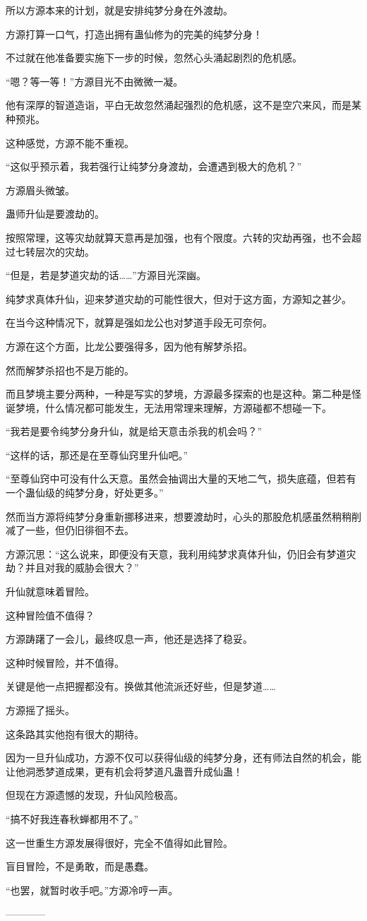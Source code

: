 \begin{this_body}
所以方源本来的计划，就是安排纯梦分身在外渡劫。

方源打算一口气，打造出拥有蛊仙修为的完美的纯梦分身！

不过就在他准备要实施下一步的时候，忽然心头涌起剧烈的危机感。

“嗯？等一等！”方源目光不由微微一凝。

他有深厚的智道造诣，平白无故忽然涌起强烈的危机感，这不是空穴来风，而是某种预兆。

这种感觉，方源不能不重视。

“这似乎预示着，我若强行让纯梦分身渡劫，会遭遇到极大的危机？”

方源眉头微皱。

蛊师升仙是要渡劫的。

按照常理，这等灾劫就算天意再是加强，也有个限度。六转的灾劫再强，也不会超过七转层次的灾劫。

“但是，若是梦道灾劫的话……”方源目光深幽。

纯梦求真体升仙，迎来梦道灾劫的可能性很大，但对于这方面，方源知之甚少。

在当今这种情况下，就算是强如龙公也对梦道手段无可奈何。

方源在这个方面，比龙公要强得多，因为他有解梦杀招。

然而解梦杀招也不是万能的。

而且梦境主要分两种，一种是写实的梦境，方源最多探索的也是这种。第二种是怪诞梦境，什么情况都可能发生，无法用常理来理解，方源碰都不想碰一下。

“我若是要令纯梦分身升仙，就是给天意击杀我的机会吗？”

“这样的话，那还是在至尊仙窍里升仙吧。”

“至尊仙窍中可没有什么天意。虽然会抽调出大量的天地二气，损失底蕴，但若有一个蛊仙级的纯梦分身，好处更多。”

然而当方源将纯梦分身重新挪移进来，想要渡劫时，心头的那股危机感虽然稍稍削减了一些，但仍旧徘徊不去。

方源沉思：“这么说来，即便没有天意，我利用纯梦求真体升仙，仍旧会有梦道灾劫？并且对我的威胁会很大？”

升仙就意味着冒险。

这种冒险值不值得？

方源踌躇了一会儿，最终叹息一声，他还是选择了稳妥。

这种时候冒险，并不值得。

关键是他一点把握都没有。换做其他流派还好些，但是梦道……

方源摇了摇头。

这条路其实他抱有很大的期待。

因为一旦升仙成功，方源不仅可以获得仙级的纯梦分身，还有师法自然的机会，能让他洞悉梦道成果，更有机会将梦道凡蛊晋升成仙蛊！

但现在方源遗憾的发现，升仙风险极高。

“搞不好我连春秋蝉都用不了。”

这一世重生方源发展得很好，完全不值得如此冒险。

盲目冒险，不是勇敢，而是愚蠢。

“也罢，就暂时收手吧。”方源冷哼一声。

------------

\end{this_body}

